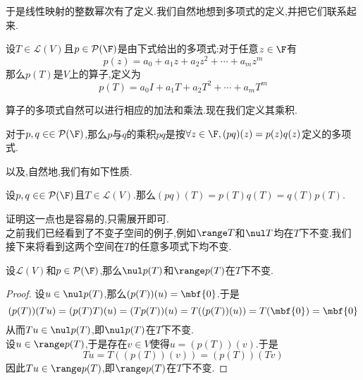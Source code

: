 \documentclass{ctexart}
\begin{document}
于是线性映射的整数幂次有了定义.我们自然地想到多项式的定义,并把它们联系起来.
\begin{definition}[2.2 定义:算子的多项式]
    设$T\in\mathcal{L}(V)$且$p\in\mathcal{P}(\F)$是由下式给出的多项式:对于任意$z\in\F$有
    $$p(z)=a_0+a_1z+a_2z^2+\cdots+a_mz^m$$
    那么$p(T)$是$V$上的算子,定义为
    $$p(T)=a_0I+a_1T+a_2T^2+\cdots+a_mT^m$$
\end{definition}\noindent
算子的多项式自然可以进行相应的加法和乘法.现在我们定义其乘积.
\begin{definition}[2.3 定义:多项式的乘积]
    对于$p,q\in\in\mathcal{P}(\F)$,那么$p$与$q$的乘积$pq$是按$\forall z\in\F,(pq)(z)=p(z)q(z)$定义的多项式.
\end{definition}\noindent
以及,自然地,我们有如下性质.
\begin{formal}[2.4 乘积的性质]
    设$p,q\in\in\mathcal{P}(\F)$且$T\in\mathcal{L}(V)$.那么$(pq)(T)=p(T)q(T)=q(T)p(T)$.
\end{formal}\noindent
证明这一点也是容易的,只需展开即可.\\
之前我们已经看到了不变子空间的例子,例如$\range T$和$\nul T$均在$T$下不变.我们接下来将看到这两个空间在$T$的任意多项式下均不变.
\begin{formal}
    设$\mathcal{L}(V)$和$p\in\mathcal{P}(\F)$,那么$\nul p(T)$和$\range p(T)$在$T$下不变.
\end{formal}
\begin{proof}
    设$u\in\nul p(T)$,那么$(p(T))(u)=\mbf{0}$.于是
    $$(p(T))(Tu)=(p(T)T)(u)=(Tp(T))(u)=T((p(T))(u))=T(\mbf{0})=\mbf{0}$$
    从而$Tu\in\nul p(T)$,即$\nul p(T)$在$T$下不变.\\
    设$u\in\range p(T)$,于是存在$v\in V$使得$u=(p(T))(v)$.于是
    $$Tu=T((p(T))(v))=(p(T))(Tv)$$
    因此$Tu\in\range p(T)$,即$\range p(T)$在$T$下不变.
\end{proof}
\end{document}
